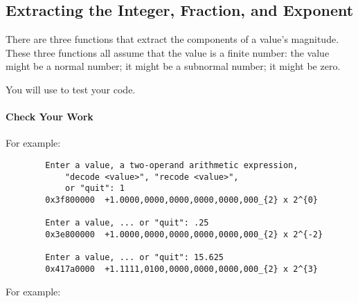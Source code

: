 \subsection{Extracting the Integer, Fraction, and Exponent} \label{subsec:printing}

There are three functions that extract the components of a value's magnitude.
These three functions all assume that the value is a finite number:
the value might be a normal number;
it might be a subnormal number;
it might be zero.

\begin{description}
\end{description}

You will use  to test your code.


\paragraph*{Check Your Work}

\begin{description}
\end{description}
For example:

\begin{verbatim}
        Enter a value, a two-operand arithmetic expression,
            "decode <value>", "recode <value>",
            or "quit": 1
        0x3f800000	+1.0000,0000,0000,0000,0000,000_{2} x 2^{0}

        Enter a value, ... or "quit": .25
        0x3e800000	+1.0000,0000,0000,0000,0000,000_{2} x 2^{-2}

        Enter a value, ... or "quit": 15.625
        0x417a0000	+1.1111,0100,0000,0000,0000,000_{2} x 2^{3}
\end{verbatim}

\begin{description}
\end{description}
For example:

